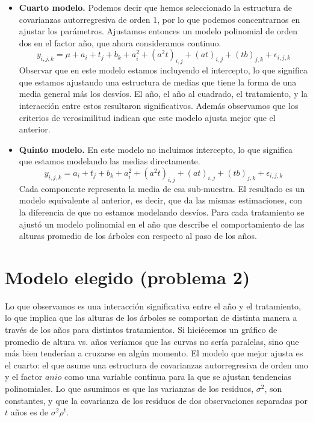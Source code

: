 \documentclass[a4paper,10pt]{article}
\begin{document}
\begin{itemize}
  \item \textbf{Cuarto modelo.} Podemos decir que hemos seleccionado la estructura de covarianzas autorregresiva de orden 1, por lo que podemos concentrarnos
  en ajustar los parámetros. Ajustamos entonces un modelo polinomial de orden dos en el factor año, que ahora consideramos continuo. 
  \begin{equation*}
   y_{i,j,k} = \mu + a_i + t_j + b_k + a^2_i + (a^2 t)_{i,j} +(at)_{i,j} + (tb)_{j,k} + \epsilon_{i,j,k}
  \end{equation*}
  Observar que en este modelo estamos incluyendo el intercepto, lo que significa que estamos ajustando una estructura de medias que tiene la forma de una
  media general más los desvíos. El año, el año al cuadrado, el tratamiento, y la interacción entre estos resultaron significativos.
  Además observamos que los criterios de verosimilitud indican que este modelo ajusta mejor que el anterior.
  
  \item \textbf{Quinto modelo.} En este modelo no incluimos intercepto, lo que significa que estamos modelando las medias directamente. 
  \begin{equation*}
   y_{i,j,k} = a_i + t_j + b_k + a^2_i + (a^2 t)_{i,j} +(at)_{i,j} + (tb)_{j,k} + \epsilon_{i,j,k}
  \end{equation*}
  Cada componente representa la media de esa sub-muestra.
  El resultado es un modelo equivalente al anterior, es decir, que da las mismas estimaciones, con la diferencia de que no estamos modelando desvíos.
  Para cada tratamiento se 
  ajustó un modelo polinomial en el año que describe el comportamiento de las alturas promedio de los árboles con respecto al paso de los años.
\end{itemize}



\section{Modelo elegido (problema 2)}

Lo que observamos es una interacción significativa entre el año y el tratamiento, lo que implica que las alturas de los árboles se comportan de distinta
manera a través de los años para distintos tratamientos. Si hiciécemos un gráfico de promedio de altura vs. años veríamos que las curvas no sería 
paralelas, sino que más bien tenderían a cruzarse en algún momento.
El modelo que mejor ajusta es el cuarto: el que asume una estructura de covarianzas autorregresiva de orden uno y el factor $anio$ como una variable 
continua para la que se ajustan tendencias polinomiales. Lo que asumimos es que las varianzas de los residuos, $\sigma^2$, son constantes, y que la covarianza
de los residuos de dos observaciones separadas por $t$ años es de $\sigma^2 \rho^t$.
\end{document}
